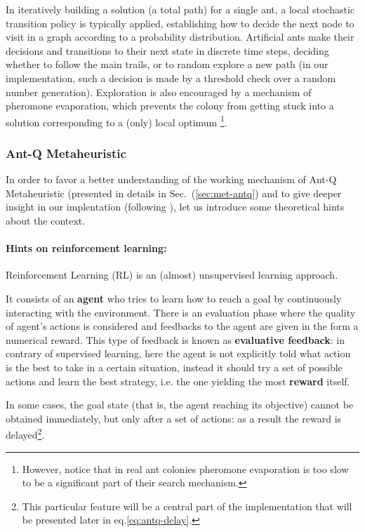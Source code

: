 \documentclass[10pt]{article}
\begin{document}
In iteratively building a solution (a total path) for a single ant, a local stochastic  transition policy is typically applied, establishing how to decide the next node to visit in a graph according to a probability distribution. Artificial  ants  make  their  decisions  and  transitions  to  their  next  state  in  discrete  time steps, deciding whether to follow the main trails, or to random explore a new path (in our implementation, such a decision is made by a threshold check over a random number generation).
Exploration is also encouraged  by a mechanism of  pheromone  evaporation, which prevents the  colony from  getting stuck into a solution corresponding to a (only) local optimum \footnote{However, notice that in real ant colonies pheromone evaporation is too slow to be a significant part of their search mechanism.}.

\subsubsection{Ant-Q Metaheuristic}\label{sec:antq}
In order to favor a better understanding of the working mechanism of Ant-Q Metaheuristic (presented in details in Sec.~(\ref{sec:met-antq}) and to give deeper insight in our implentation (following \cite{undici} ), let us introduce some theoretical hints about the context.
\paragraph{Hints on reinforcement learning:}
Reinforcement  Learning  (RL)  is  an  (almost) unsupervised  learning  approach.

It consists of an  \textbf{agent}  who tries to learn how to reach a goal by continuously interacting with  the environment. 
There is an evaluation phase where the quality of agent's actions is considered and feedbacks to the agent are given in the form a numerical reward. 
This type of feedback is known as \textbf{evaluative feedback}: in contrary of supervised learning, here the agent is not explicitly told what action is the best to take in a  certain  situation, instead it should try a set of possible actions and learn the best strategy, i.e. the one yielding the most \textbf{reward} itself.  

In some cases, the goal state (that is, the agent reaching its objective) cannot be obtained immediately, but only after a set of actions: as a result the reward is delayed\footnote{This particular feature will be a central part of the implementation that will be presented later in eq.\ref{eq:antq-delay}.}. 
\end{document}
